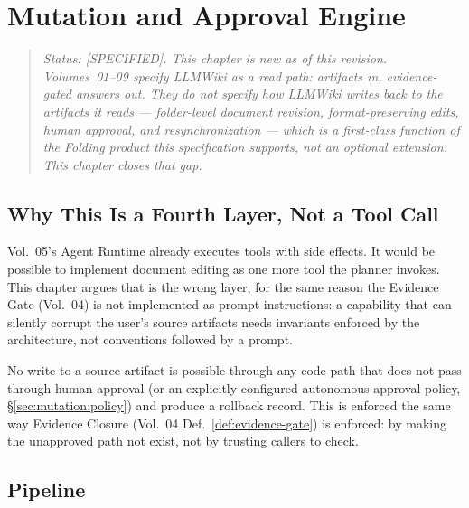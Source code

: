 \chapter{Mutation and Approval Engine}
\label{cha:mutation}

\begin{quote}
\textit{Status: [SPECIFIED]. This chapter is new as of this revision. Volumes~01--09 specify LLMWiki as a read path: artifacts in, evidence-gated answers out. They do not specify how LLMWiki writes back to the artifacts it reads --- folder-level document revision, format-preserving edits, human approval, and resynchronization --- which is a first-class function of the Folding product this specification supports, not an optional extension. This chapter closes that gap.}
\end{quote}

\section{Why This Is a Fourth Layer, Not a Tool Call}
\label{sec:mutation:why}

Vol.~05's Agent Runtime already executes tools with side effects. It would be possible to implement document editing as one more tool the planner invokes. This chapter argues that is the wrong layer, for the same reason the Evidence Gate (Vol.~04) is not implemented as prompt instructions: a capability that can silently corrupt the user's source artifacts needs invariants enforced by the architecture, not conventions followed by a prompt.

\begin{designprinciple}
No write to a source artifact is possible through any code path that does not pass through human approval (or an explicitly configured autonomous-approval policy, \S\ref{sec:mutation:policy}) and produce a rollback record. This is enforced the same way Evidence Closure (Vol.~04 Def.~\ref{def:evidence-gate}) is enforced: by making the unapproved path not exist, not by trusting callers to check.
\end{designprinciple}

\section{Pipeline}
\label{sec:mutation:pipeline}

